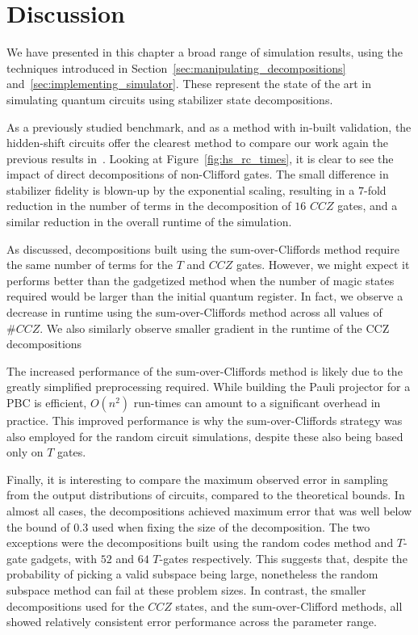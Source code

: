 \section{Discussion}
We have presented in this chapter a broad range of simulation results, using the techniques introduced in Section~\ref{sec:manipulating_decompositions} and~\ref{sec:implementing_simulator}. These represent the state of the art in simulating quantum circuits using stabilizer state decompositions.\par
As a previously studied benchmark, and as a method with in-built validation, the hidden-shift circuits offer the clearest method to compare our work again the previous results in~\cite{Bravyi2016}. Looking at Figure~\ref{fig:hs_rc_times}, it is clear to see the impact of direct decompositions of non-Clifford gates. The small difference in stabilizer fidelity is blown-up by the exponential scaling, resulting in a $7$-fold reduction in the number of terms in the decomposition of $16$ $CCZ$ gates, and a similar reduction in the overall runtime of the simulation.\par
As discussed, decompositions built using the sum-over-Cliffords method require the same number of terms for the $T$ and $CCZ$ gates. However, we might expect it performs better than the gadgetized method when the number of magic states required would be larger than the initial quantum register. In fact, we observe a decrease in runtime using the sum-over-Cliffords method across all values of $\# CCZ$. We also similarly observe smaller gradient in the runtime of the CCZ decompositions\par
The increased performance of the sum-over-Cliffords method is likely due to the greatly simplified preprocessing required. While building the Pauli projector for a PBC is efficient, $O(n^{2})$ run-times can amount to a significant overhead in practice. This improved performance is why the sum-over-Cliffords strategy was also employed for the random circuit simulations, despite these also being based only on $T$ gates.\par
Finally, it is interesting to compare the maximum observed error in sampling from the output distributions of circuits, compared to the theoretical bounds. In almost all cases, the decompositions achieved maximum error that was well below the bound of $0.3$ used when fixing the size of the decomposition. The two exceptions were the decompositions built using the random codes method and $T$-gate gadgets, with $52$ and $64$ $T$-gates respectively. This suggests that, despite the probability of picking a valid subspace being large, nonetheless the random subspace method can fail at these problem sizes. In contrast, the smaller decompositions used for the $CCZ$ states, and the sum-over-Clifford methods, all showed relatively consistent error performance across the parameter range.\par
